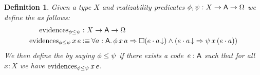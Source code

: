 \documentclass[11pt]{article}
\newtheorem{defn}[thrm]{Definition}
\begin{document}
\begin{defn}\label{defn:tripos-ordering}
  Given a type \(X\) and realizability predicates \(\phi,\psi : {{X}\to{{{\ensuremath{\mathsf{A}}}\to{\Omega}}}}\)
  we define the  as
  follows:
  \begin{align*}
    \IEvidence{\phi}{\psi}
    &: \IRealPred{X}
    \\
    {\IEvidence{\phi}{\psi}\,x\,e}
    &\IsDefined
      \IForall%
      {a:\A}%
      {\IImplies%
      {\phi\,x\,a}%
      {\IAnd%
      {\IBox{(\ITotal{\IAp{e}{a}})}}%
      {(\IImplies{\ITotal{\IAp{e}{a}}}{\psi\,x\,(\IAp{e}{a})})}}}
  \end{align*}
  We then define the  by saying \({\phi}\leq{\psi}\) if there exists a
  code~\(e : \mathsf{A}\) such that for all \(x : X\) we have
  \(\text{evidences}_{{\phi}\leq{\psi}}\,x\,e\).
\end{defn}
\end{document}
